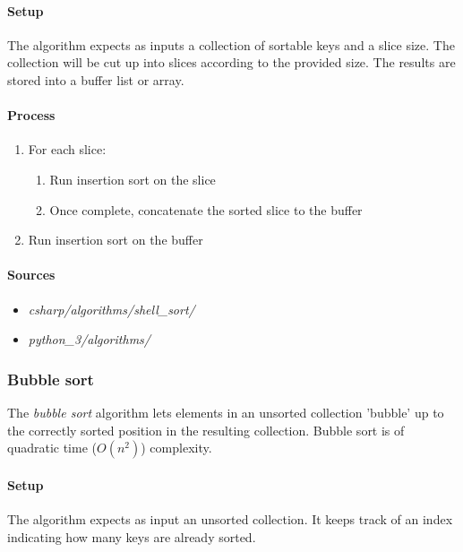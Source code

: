 \documentclass{article}
\begin{document}
\paragraph{Setup}
The algorithm expects as inputs a collection of sortable keys and a slice size. The collection will be cut up into
slices according to the provided size. The results are stored into a buffer list or array.

\paragraph{Process}
\begin{enumerate}
\item{For each slice:}
  \begin{enumerate}
  \item{Run insertion sort on the slice}
  \item{Once complete, concatenate the sorted slice to the buffer}
  \end{enumerate}
\item{Run insertion sort on the buffer}
\end{enumerate}

\begin{samepage}
  \paragraph{Sources}
  \begin{itemize}
  \item{{\em csharp/algorithms/shell\_sort/}}
  \item{{\em python\_3/algorithms/}}
  \end{itemize}
\end{samepage}


\subsubsection{Bubble sort}
The {\em bubble sort} algorithm lets elements in an unsorted collection 'bubble' up to the correctly sorted position
in the resulting collection. Bubble sort is of quadratic time (\(O(n^2)\)) complexity.

\paragraph{Setup}
The algorithm expects as input an unsorted collection. It keeps track of an index indicating how many keys are
already sorted.
\end{document}
